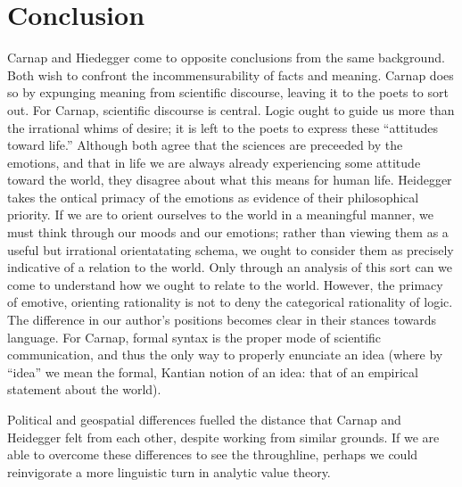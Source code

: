 \documentclass[leqno, 12pt]{turabian-researchpaper}
\begin{document}
	\section{Conclusion}

	Carnap and Hiedegger come to opposite conclusions from the same background.
	Both wish to confront the incommensurability of facts and meaning. Carnap does
	so by expunging meaning from scientific discourse, leaving it to the poets to
	sort out. For Carnap, scientific discourse is central. Logic ought to guide us
	more than the irrational whims of desire; it is left to the poets to express
	these \enquote{attitudes toward life.} Although both agree that the sciences are
	preceeded by the emotions, and that in life we are always already experiencing
	some attitude toward the world, they disagree about what this means for human life.
	Heidegger takes the ontical primacy of the emotions as evidence of their
	philosophical priority. If we are to orient ourselves to the world in a meaningful
	manner, we must think through our moods and our emotions; rather than viewing them
	as a useful but irrational orientatating schema, we ought to consider them as
	precisely indicative of a relation to the world. Only through an analysis of this
	sort can we come to understand how we ought to relate to the world. However, the
	primacy of emotive, orienting rationality is not to deny the categorical
	rationality of logic. The difference in our author's positions becomes clear in
	their stances towards language. For Carnap, formal syntax is the proper mode of
	scientific communication, and thus the only way to properly enunciate an idea
	(where by \enquote{idea} we mean the formal, Kantian notion of an idea: that
	of an empirical statement about the world). %

	Political and geospatial differences fuelled the distance that Carnap and
	Heidegger felt from each other, despite working from similar grounds. If we
	are able to overcome these differences to see the throughline, perhaps we could
	reinvigorate a more linguistic turn in analytic value theory. %

	\clearpage
	\printbibliography
\end{document}
